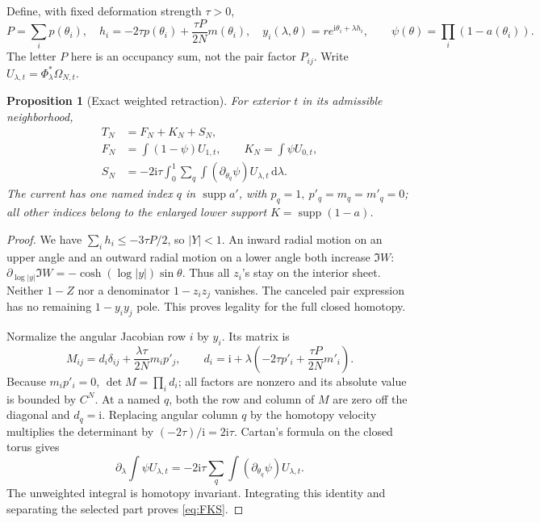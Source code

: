 \documentclass[11pt]{article}
\numberwithin{equation}{section}
\newtheorem{proposition}[theorem]{Proposition}
\theoremstyle{definition}
\newcommand{\dd}{\,\mathrm d}
\newcommand{\ii}{\mathrm i}
\begin{document}
Define, with fixed deformation strength \(\tau>0\),
\[
 P=\sum_i p(\theta_i),\quad
 h_i=-2\tau p(\theta_i)+\frac{\tau P}{2N}m(\theta_i),\quad
 y_i(\lambda,\theta)=r e^{\ii\theta_i+\lambda h_i},
 \qquad \psi(\theta)=\prod_i(1-a(\theta_i)).
\]
The letter \(P\) here is an occupancy sum, not the pair factor \(P_{ij}\).
Write \(U_{\lambda,t}=\Phi_\lambda^*\Omega_{N,t}\).

\begin{proposition}[Exact weighted retraction]\label{prop:selector}
For exterior \(t\) in its admissible neighborhood,
\begin{align}
 T_N&=F_N+K_N+S_N,\label{eq:FKS}\\
 F_N&=\int(1-\psi)U_{1,t},\qquad K_N=\int\psi U_{0,t},\nonumber\\
 S_N&=-2\ii\tau\int_0^1\sum_q\int
                         (\partial_{\theta_q}\psi)U_{\lambda,t}\dd\lambda.
 \label{eq:current}
\end{align}
The current has one named index \(q\) in \(\operatorname{supp}a'\),
with \(p_q=1,\ p'_q=m_q=m'_q=0\); all other indices belong to
the enlarged lower support \(K=\operatorname{supp}(1-a)\).
\end{proposition}
\begin{proof}
We have \(\sum_i h_i\le-3\tau P/2\), so \(|Y|<1\).
An inward radial motion on an upper angle and an outward radial motion
on a lower angle both increase \(\Im W\):
\(\partial_{\log|y|}\Im W=-\cosh(\log|y|)\sin\theta\).
Thus all \(z_i\)'s stay on the interior sheet. Neither \(1-Z\)
nor a denominator \(1-z_iz_j\) vanishes. The canceled pair expression
has no remaining \(1-y_iy_j\) pole. This proves legality for the full
closed homotopy.

Normalize the angular Jacobian row \(i\) by \(y_i\). Its matrix is
\[
 M_{ij}=d_i\delta_{ij}+\frac{\lambda\tau}{2N}m_i p'_j,\qquad
 d_i=\ii+\lambda\left(-2\tau p'_i+\frac{\tau P}{2N}m'_i\right).
\]
Because \(m_ip'_i=0\), \(\det M=\prod_i d_i\); all factors are
nonzero and its absolute value is bounded by \(C^N\).
At a named \(q\), both the row and column of \(M\) are zero
off the diagonal and \(d_q=\ii\). Replacing angular column \(q\)
by the homotopy velocity multiplies the determinant by
\((-2\tau)/\ii=2\ii\tau\).
Cartan's formula on the closed torus gives
\[
 \partial_\lambda\int\psi U_{\lambda,t}
 =-2\ii\tau\sum_q\int(\partial_{\theta_q}\psi)U_{\lambda,t}.
\]
The unweighted integral is homotopy invariant. Integrating this identity
and separating the selected part proves \eqref{eq:FKS}.
\end{proof}
\end{document}
